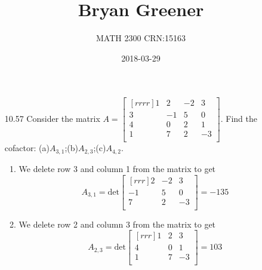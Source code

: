 \documentclass[12pt]{article}
\title{Bryan Greener}
\author{MATH 2300 CRN:15163}
\date{2018-03-29}
\theoremstyle{definition}
\theoremstyle{plain}
\begin{document}
\maketitle

\TabPositions{4cm}

\begin{enumerate}
\item[10.57]Consider the matrix $A=\begin{bmatrix}[rrrr]1&2&-2&3\\3&-1&5&0\\4&0&2&1\\1&7&2&-3\\\end{bmatrix}$. Find the cofactor: (a)$A_{3,1}$;(b)$A_{2,3}$;(c)$A_{4,2}$.
	\begin{enumerate}
	\item We delete row 3 and column 1 from the matrix to get
	\[ A_{3,1}=\mathrm{det}\begin{bmatrix}[rrr]2&-2&3\\-1&5&0\\7&2&-3\\\end{bmatrix} = -135 \]
	\item We delete row 2 and column 3 from the matrix to get
	\[ A_{2,3}=\mathrm{det}\begin{bmatrix}[rrr]1&2&3\\4&0&1\\1&7&-3\\\end{bmatrix} = 103 \]
	\end{enumerate}
	

\end{enumerate}
\end{document}
